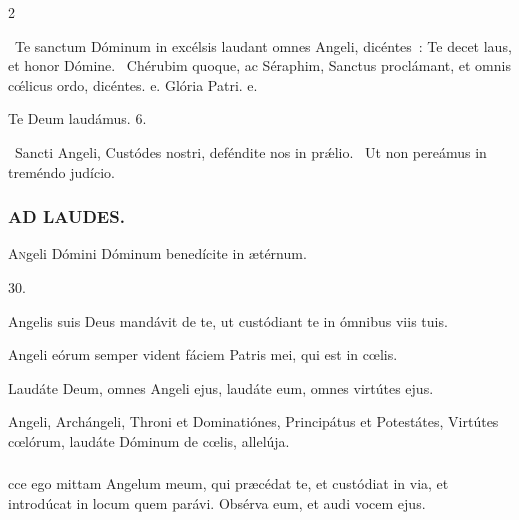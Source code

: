 \documentclass[9pt,twoside]{extarticle}
\begin{document}
\begin{multicols}{2}
{\begin{tightlist}{}
\item {}~Te sanctum Dóminum in excélsis laudant omnes Angeli, dicéntes~: \textred{*} Te decet laus, et honor Dómine. ~Chérubim quoque, ac Séraphim, Sanctus proclámant, et omnis cœ́licus ordo, dicéntes. e. Glória Patri. e.
\item Te Deum laudámus. 6.
\item {}~Sancti Angeli, Custódes nostri, deféndite nos in prǽlio. ~Ut non pereámus in treméndo judício.
\end{tightlist}

\subsubsection*{\center \textsc{AD LAUDES.}}
\begin{center}\end{center}
\lettrine{A}ngeli Dómini Dóminum benedícite in ætérnum.

\begin{tightlist}{}
\item {} 30.
\item {} Angelis suis Deus mandávit de te, ut custódiant te in ómnibus viis tuis.
\item {} Angeli eórum semper vident fáciem Patris mei, qui est in cœlis.
\item {} Laudáte Deum, omnes Angeli ejus, laudáte eum, omnes virtútes ejus.
\item {} Angeli, Archángeli, Throni et Dominatiónes, Principátus et Potestátes, Virtútes cœlórum, laudáte Dóminum de cœlis, allelúja.
\end{tightlist}

\subsubsection*{}
cce ego mittam Angelum meum, qui præcédat te, et custódiat in via, et introdúcat in locum quem parávi. Obsérva eum, et audi vocem ejus.

}
\end{multicols}
\end{document}
